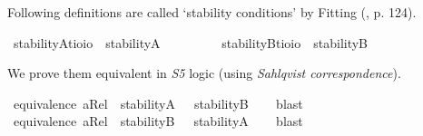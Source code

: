 \begin{isabellebody}
\begin{isamarkuptext}%
Following definitions are called `stability conditions' by Fitting (\cite{Fitting}, p. 124).%
\end{isamarkuptext}\isamarkuptrue%
\isamarkupfalse%
\ stabilityA{\isacharcolon}{\isacharcolon}{\isachardoublequoteopen}{\isacharparenleft}{\isacharprime}t{\isasymRightarrow}io{\isacharparenright}{\isasymRightarrow}io{\isachardoublequoteclose}\ \ {\isachardoublequoteopen}stabilityA\ {\isasymtau}\ {\isasymequiv}\ \isactrlbold {\isasymforall}{\isasymalpha}{\isachardot}\ {\isacharparenleft}{\isasymtau}\ {\isasymalpha}{\isacharparenright}\ \isactrlbold {\isasymrightarrow}\ \isactrlbold {\isasymbox}{\isacharparenleft}{\isasymtau}\ {\isasymalpha}{\isacharparenright}{\isachardoublequoteclose}\isanewline
{}\isamarkupfalse%
\ stabilityB{\isacharcolon}{\isacharcolon}{\isachardoublequoteopen}{\isacharparenleft}{\isacharprime}t{\isasymRightarrow}io{\isacharparenright}{\isasymRightarrow}io{\isachardoublequoteclose}\ \ {\isachardoublequoteopen}stabilityB\ {\isasymtau}\ {\isasymequiv}\ \isactrlbold {\isasymforall}{\isasymalpha}{\isachardot}\ \isactrlbold {\isasymdiamond}{\isacharparenleft}{\isasymtau}\ {\isasymalpha}{\isacharparenright}\ \isactrlbold {\isasymrightarrow}\ {\isacharparenleft}{\isasymtau}\ {\isasymalpha}{\isacharparenright}{\isachardoublequoteclose}%
\begin{isamarkuptext}%
We prove them equivalent in \emph{S5} logic (using \emph{Sahlqvist correspondence}).%
\end{isamarkuptext}\isamarkuptrue%
\isamarkupfalse%
\ {\isachardoublequoteopen}equivalence\ aRel\ {\isasymLongrightarrow}\ {\isasymlfloor}stabilityA\ {\isacharparenleft}{\isasymtau}{\isacharcolon}{\isacharcolon}{\isasymup}{\isasymlangle}{\isasymzero}{\isasymrangle}{\isacharparenright}{\isasymrfloor}\ {\isasymlongrightarrow}\ {\isasymlfloor}stabilityB\ {\isasymtau}{\isasymrfloor}{\isachardoublequoteclose}%
\ %
%
\isamarkupfalse%
\ blast%
%
%
\ \ \ \ \isanewline
{}\isamarkupfalse%
\ {\isachardoublequoteopen}equivalence\ aRel\ {\isasymLongrightarrow}\ {\isasymlfloor}stabilityB\ {\isacharparenleft}{\isasymtau}{\isacharcolon}{\isacharcolon}{\isasymup}{\isasymlangle}{\isasymzero}{\isasymrangle}{\isacharparenright}{\isasymrfloor}\ {\isasymlongrightarrow}\ {\isasymlfloor}stabilityA\ {\isasymtau}{\isasymrfloor}{\isachardoublequoteclose}%
\ %
%
\isamarkupfalse%
\ blast%
%
%
%
\begin{isamarkuptext}%

\end{isamarkuptext}
\end{isabellebody}

